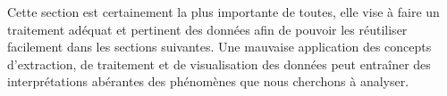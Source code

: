 Cette section est certainement la plus importante de toutes, elle vise à faire un traitement adéquat et pertinent des données afin de pouvoir les réutiliser facilement dans les sections suivantes. Une mauvaise application des concepts d’extraction, de traitement et de visualisation des données peut entraîner des interprétations abérantes des phénomènes que nous cherchons à analyser.


